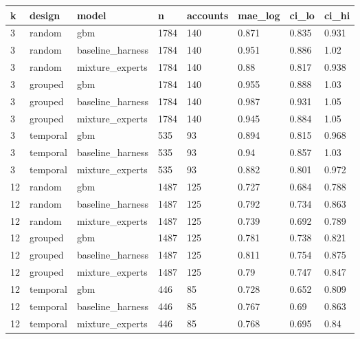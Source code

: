 \begin{tabular}{llllllll}
\toprule
k & design & model & n & accounts & mae\_log & ci\_lo & ci\_hi \\
\midrule
3 & random & gbm & 1784 & 140 & 0.871 & 0.835 & 0.931 \\
3 & random & baseline\_harness & 1784 & 140 & 0.951 & 0.886 & 1.02 \\
3 & random & mixture\_experts & 1784 & 140 & 0.88 & 0.817 & 0.938 \\
3 & grouped & gbm & 1784 & 140 & 0.955 & 0.888 & 1.03 \\
3 & grouped & baseline\_harness & 1784 & 140 & 0.987 & 0.931 & 1.05 \\
3 & grouped & mixture\_experts & 1784 & 140 & 0.945 & 0.884 & 1.05 \\
3 & temporal & gbm & 535 & 93 & 0.894 & 0.815 & 0.968 \\
3 & temporal & baseline\_harness & 535 & 93 & 0.94 & 0.857 & 1.03 \\
3 & temporal & mixture\_experts & 535 & 93 & 0.882 & 0.801 & 0.972 \\
12 & random & gbm & 1487 & 125 & 0.727 & 0.684 & 0.788 \\
12 & random & baseline\_harness & 1487 & 125 & 0.792 & 0.734 & 0.863 \\
12 & random & mixture\_experts & 1487 & 125 & 0.739 & 0.692 & 0.789 \\
12 & grouped & gbm & 1487 & 125 & 0.781 & 0.738 & 0.821 \\
12 & grouped & baseline\_harness & 1487 & 125 & 0.811 & 0.754 & 0.875 \\
12 & grouped & mixture\_experts & 1487 & 125 & 0.79 & 0.747 & 0.847 \\
12 & temporal & gbm & 446 & 85 & 0.728 & 0.652 & 0.809 \\
12 & temporal & baseline\_harness & 446 & 85 & 0.767 & 0.69 & 0.863 \\
12 & temporal & mixture\_experts & 446 & 85 & 0.768 & 0.695 & 0.84 \\
\bottomrule
\end{tabular}